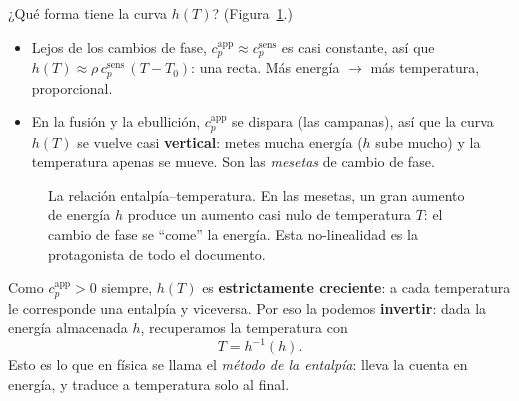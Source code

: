 \documentclass[11pt]{article}
\newcommand{\cpapp}{c_p^{\mathrm{app}}}
\newcommand{\cpsens}{c_p^{\mathrm{sens}}}
\theoremstyle{definition}
\theoremstyle{plain}
\begin{document}
¿Qué forma tiene la curva $h(T)$? (Figura~\ref{fig:hcurve}.)
\begin{itemize}[leftmargin=1.5em]
  \item Lejos de los cambios de fase, $\cpapp\approx\cpsens$ es casi constante, así
  que $h(T)\approx \rho\,\cpsens\,(T-T_0)$: una recta. Más energía $\to$ más
  temperatura, proporcional.
  \item En la fusión y la ebullición, $\cpapp$ se dispara (las campanas), así que
  la curva $h(T)$ se vuelve casi \textbf{vertical}: metes mucha energía ($h$ sube
  mucho) y la temperatura apenas se mueve. Son las \emph{mesetas} de cambio de
  fase.
\end{itemize}

\begin{figure}[t]
\centering
{}
\caption{La relación entalpía--temperatura. En las mesetas, un gran aumento de
energía $h$ produce un aumento casi nulo de temperatura $T$: el cambio de fase se
``come'' la energía. Esta no-linealidad es la protagonista de todo el documento.}
\label{fig:hcurve}
\end{figure}

Como $\cpapp>0$ siempre, $h(T)$ es \textbf{estrictamente creciente}: a cada
temperatura le corresponde una entalpía y viceversa. Por eso la podemos
\textbf{invertir}: dada la energía almacenada $h$, recuperamos la temperatura con
\begin{equation}
  \boxed{\;T = h^{-1}(h).\;}
  \label{eq:hinv}
\end{equation}
Esto es lo que en física se llama el \emph{método de la entalpía}: lleva la cuenta
en energía, y traduce a temperatura solo al final.
\end{document}
